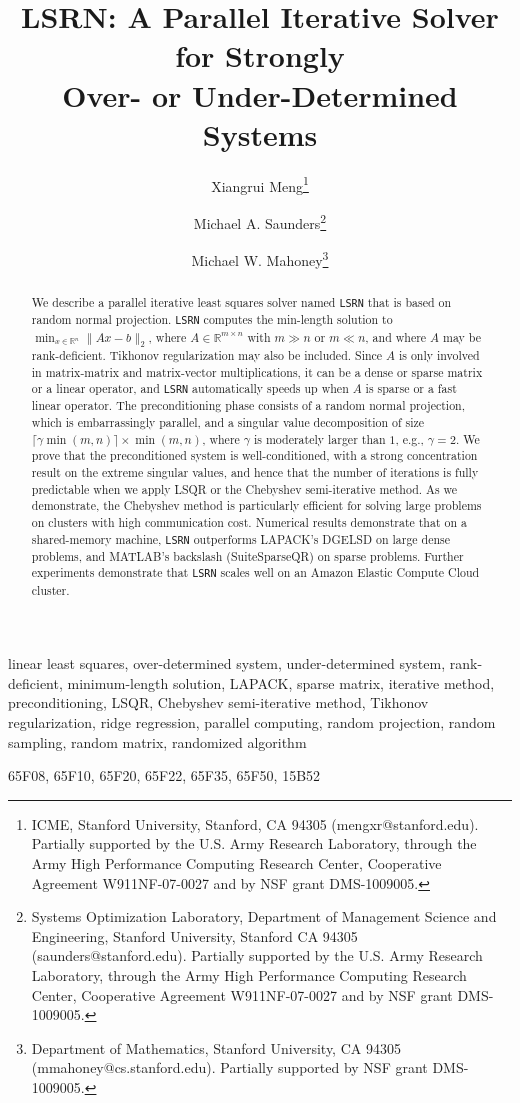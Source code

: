 \documentclass{siamltex}
\title{LSRN: A Parallel Iterative Solver for Strongly
    \\ Over- or Under-Determined Systems}
\author{Xiangrui Meng\thanks{ICME, Stanford University, Stanford, CA 94305 (mengxr@stanford.edu).
    Partially supported by the U.S. Army Research Laboratory, through the
    Army High Performance Computing Research Center, Cooperative Agreement W911NF-07-0027
    and by NSF grant DMS-1009005.}
  \and Michael A. Saunders\thanks{Systems Optimization Laboratory, Department of Management Science and
    Engineering, Stanford University, Stanford CA 94305 (saunders@stanford.edu).
    Partially supported by the U.S. Army Research Laboratory, through the
    Army High Performance Computing Research Center, Cooperative Agreement W911NF-07-0027
    and by NSF grant DMS-1009005.}
  \and Michael W. Mahoney\thanks{Department of Mathematics, Stanford University, CA 94305 (mmahoney@cs.stanford.edu).
    Partially supported by NSF grant DMS-1009005.}}
\begin{document}
\maketitle

\begin{abstract}
  We describe a parallel iterative least squares solver named \texttt{LSRN} that
  is based on random normal projection.  \texttt{LSRN} computes the
  min-length solution to $\min_{x \in \mathbb{R}^n} \|A x - b\|_2$, where $A \in
  \mathbb{R}^{m \times n}$ with $m \gg n$ or $m \ll n$, and where $A$ may be
  rank-deficient. Tikhonov regularization may also be included. Since $A$ is
  only involved in matrix-matrix and matrix-vector multiplications, it can be a
  dense or sparse matrix or a linear operator, and \texttt{LSRN} automatically
  speeds up when $A$ is sparse or a fast linear operator. The preconditioning
  phase consists of a random normal projection, which is embarrassingly
  parallel, and a singular value decomposition of size $\lceil \gamma \min(m,n)
  \rceil \times \min(m,n)$, where $\gamma$ is moderately larger than $1$, e.g.,
  $\gamma = 2$.  We prove that the preconditioned system is well-conditioned,
  with a strong concentration result on the extreme singular values, and hence
  that the number of iterations is fully predictable when we apply LSQR or the
  Chebyshev semi-iterative method.  As we demonstrate, the Chebyshev method is
  particularly efficient for solving large problems on clusters with high
  communication cost.  Numerical results demonstrate that on a shared-memory
  machine, \texttt{LSRN} outperforms LAPACK's DGELSD on large dense problems,
  and MATLAB's backslash (SuiteSparseQR) on sparse problems. Further experiments
  demonstrate that \texttt{LSRN} scales well on an Amazon Elastic Compute Cloud
  cluster.
\end{abstract}

\begin{keywords}
  linear least squares, over-determined system, under-determined system,
  rank-deficient, minimum-length solution, LAPACK, sparse matrix, iterative
  method, preconditioning, LSQR, Chebyshev semi-iterative method, Tikhonov
  regularization, ridge regression, parallel computing, random projection,
  random sampling, random matrix, randomized algorithm
\end{keywords}

\begin{AMS}
  65F08,                        65F10,                        65F20,                        65F22,                        65F35,                        65F50,                        15B52                         \end{AMS}
\end{document}
